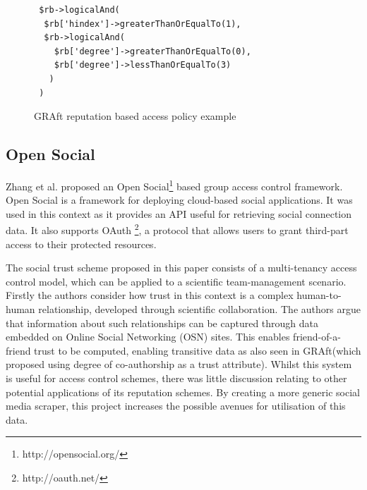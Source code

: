 

\begin{center}
\begin{figure}[h!]
\begin{verbatim}
 $rb->logicalAnd(
  $rb['hindex']->greaterThanOrEqualTo(1),
  $rb->logicalAnd(
    $rb['degree']->greaterThanOrEqualTo(0),
    $rb['degree']->lessThanOrEqualTo(3)
   )
 )
\end{verbatim}
\caption{GRAft reputation based access policy example}
\label{fig:GRAFT}
\end{figure}
\end{center}


\subsection{Open Social}

Zhang et al. \cite{zhang2012open} proposed an Open Social\footnote{http://opensocial.org/} based group access control framework. Open Social is a framework for deploying cloud-based social applications. It was used in this context as it provides an API useful for retrieving social connection data. It also supports OAuth \footnote{http://oauth.net/}, a protocol that allows users to grant third-part access to their protected resources.

The social trust scheme proposed in this paper consists of a multi-tenancy access control model, which can be applied to a scientific team-management scenario. Firstly the authors consider how trust in this context is a complex human-to-human relationship, developed through scientific collaboration. The authors argue that information about such relationships can be captured through data embedded on Online Social Networking (OSN) sites. This enables friend-of-a-friend trust to be computed, enabling transitive data as also seen in GRAft(which proposed using degree of co-authorship as a trust attribute). Whilst this system is useful for access control schemes, there was little discussion relating to other potential applications of its reputation schemes. By creating a more generic social media scraper, this project increases the possible avenues for utilisation of this data.

